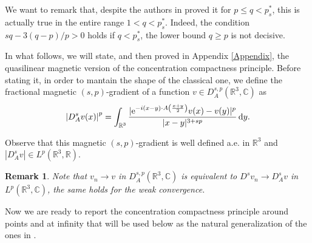 \documentclass[leqno,11pt]{amsart}
\newcommand{\R}{\mathbb R}
\newcommand{\C}{\mathbb C}
\numberwithin{equation}{section}
\newtheorem{remark}[theorem]{Remark}
\def\e{{\rm e}}
\newcommand{\expAminus}{\e^{-i(x-y)\cdot A\left(\frac{x+y}{2}\right)}}
\begin{document}
We want to remark that, despite the authors in \cite{BonderSaintierSilva} proved it for $p \leq q < p^*_s$, this is actually true in the entire range $1<q<p^*_s$. Indeed, the condition $sq - 3(q-p)/p>0$ holds if $q< p^*_s$, the lower bound $q \geq p$ is not decisive.

In what follows, we will state, and then proved in Appendix \ref{Appendix}, the quasilinear magnetic version of the concentration compactness principle. Before stating it, in order to mantain the shape of the classical one, we define the fractional magnetic $(s, p)$-gradient of a function $v \in D^{s, p}_A(\R^3,\C)$ as
\begin{equation}
\label{definition:DsA:seminorm}
   \left|D^s_A v(x)\right|^p=\int_{\R^3} \frac{|\expAminus v(x)-v(y)|^p}{|x-y|^{3+s p}} \dd y. 
\end{equation}


Observe that this magnetic $(s, p)$-gradient is well defined a.e. in $\R^3$ and $\left|D^s_A v\right| \in L^p(\R^3,\R)$.
\begin{remark}
\label{sp:gradient:convergence:remark}
    Note that $v_n\to v$ in $D^{s,p}_A(\R^3,\C)$ is equivalent to $D^s v_n\to D^s_A v$ in $L^p(\R^3,\C)$, the same holds for the weak convergence.
\end{remark}


Now we are ready to report the concentration compactness principle around points and at infinity that will be used below as the natural generalization of the ones in \cite{Lions1985, btw, BonderSaintierSilva}.
\end{document}
